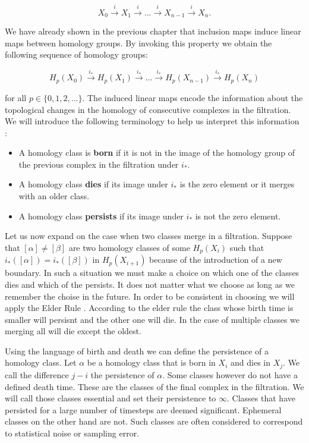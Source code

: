$$ X_0 \overset{i}{\longrightarrow} X_1 \overset{i}{\longrightarrow} ... \overset{i}{\longrightarrow} X_{n-1} \overset{i}{\longrightarrow} X_n .$$

We have already shown in the previous chapter that inclusion maps induce linear maps between homology groups. By invoking this property we obtain the following sequence of homology groups:

$$ H_p(X_0) \overset{i_*}{\longrightarrow} H_p(X_1) \overset{i_*}{\longrightarrow} ... \overset{i_*}{\longrightarrow} H_p(X_{n-1}) \overset{i_*}{\longrightarrow} H_p(X_n) $$

for all $p \in \{0, 1, 2, ...\}$. The induced linear maps encode the information about the topological changes in the homology of consecutive complexes in the filtration. We will introduce the following terminology to help us interpret this information \cite{elementary-applied-topology}:

\begin{itemize}
    \item A homology class is \textbf{born} if it is not in the image of the homology group of the previous complex in the filtration under $i_*$.
    \item A homology class \textbf{dies} if its image under $i_*$ is the zero element or it merges with an older class.
    \item A homology class \textbf{persists} if its image under $i_*$ is not the zero element.
\end{itemize}

Let us now expand on the case when two classes merge in a filtration. Suppose that $[\alpha] \ne [\beta]$ are two homology classes of some $H_p(X_i)$ such that $i_*([\alpha]) = i_*([\beta])$ in $H_p(X_{i+1})$ because of the introduction of a new boundary. In such a situation we must make a choice on which one of the classes dies and which of the persists. It does not matter what we choose as long as we remember the choise in the future. In order to be consistent in choosing we will apply the Elder Rule \cite{comp-topo}. According to the elder rule the class whose birth time is smaller will persisnt and the other one will die. In the case of multiple classes we merging all will die except the oldest.

Using the language of birth and death we can define the persistence of a homology class. Let $\alpha$ be a homology class that is born in $X_i$ and dies in $X_j$. We call the difference $j - i$ the persistence of $\alpha$. Some classes however do not have a defined death time. These are the classes of the final complex in the filtration. We will call those classes essential and set their persistence to $\infty$. Classes that have persisted for a large number of timesteps are deemed significant. Ephemeral classes on the other hand are not. Such classes are often considered to correspond to statistical noise or sampling error.

